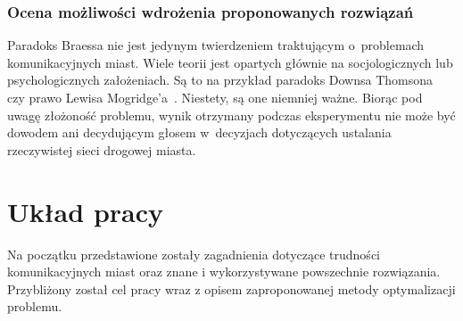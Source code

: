 \documentclass[twoside,12pt]{report}
\begin{document}
\subsubsection{Ocena możliwości wdrożenia proponowanych rozwiązań}
Paradoks Braessa nie jest jedynym twierdzeniem traktującym o~problemach komunikacyjnych miast. Wiele teorii jest opartych głównie na socjologicznych lub psychologicznych założeniach. Są to na przykład paradoks Downsa Thomsona~\cite{urban} czy prawo Lewisa Mogridge’a~\cite{lewis}. Niestety, są one niemniej ważne. Biorąc pod uwagę złożoność problemu, wynik otrzymany podczas eksperymentu nie może być dowodem ani decydującym głosem w~decyzjach dotyczących ustalania rzeczywistej sieci drogowej miasta. 





\section{Układ pracy}
Na początku przedstawione zostały zagadnienia dotyczące trudności komunikacyjnych miast oraz znane i wykorzystywane powszechnie rozwiązania. Przybliżony został cel pracy wraz z opisem zaproponowanej metody optymalizacji problemu. 
\end{document}
